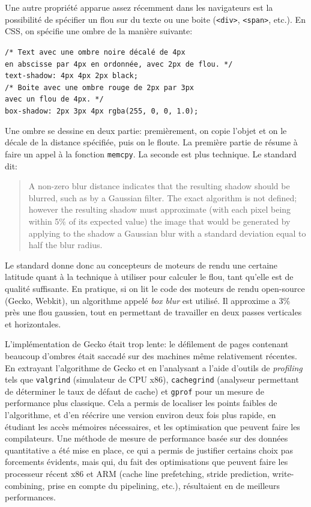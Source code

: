 \documentclass[a4paper,10pt]{article}
\newcommand{\cc}[1]{\texttt{#1}}
\begin{document}
\begin{multicols}{2}
  Une autre propriété apparue assez récemment dans les navigateurs est la
  possibilité de spécifier un flou sur du texte ou une boite (\cc{<div>},
  \cc{<span>}, etc.). En CSS, on spécifie une ombre de la manière suivante:

    \noindent
  {\footnotesize
  \cc{/* Text avec une ombre noire décalé de 4px\\
    en abscisse par 4px en ordonnée, avec 2px de flou. */\\
    text-shadow: 4px 4px 2px black;\\
    /* Boite avec une ombre rouge de 2px par 3px\\
    avec un flou de 4px. */\\
    box-shadow: 2px 3px 4px rgba(255, 0, 0, 1.0);
  }}

  Une ombre se dessine en deux partie: premièrement, on copie l'objet et on le
  décale de la distance spécifiée, puis on le floute. La première partie de
  résume à faire un appel à la fonction \cc{memcpy}. La seconde est plus
  technique. Le standard dit:

  \begin{quote}
    A non-zero blur distance indicates that the resulting shadow should be
    blurred, such as by a Gaussian filter. The exact algorithm is not defined;
    however the resulting shadow must approximate (with each pixel being within
    5\% of its expected value) the image that would be generated by applying to
    the shadow a Gaussian blur with a standard deviation equal to half the blur
    radius.
  \end{quote}

  Le standard donne donc au concepteurs de moteurs de rendu une certaine
  latitude quant à la technique à utiliser pour calculer le flou, tant qu'elle
  est de qualité suffisante. En pratique, si on lit le code des moteurs de rendu
  open-source (Gecko, Webkit), un algorithme appelé \emph{box blur} est utilisé.
  Il approxime a 3\% près une flou gaussien, tout en permettant de travailler en
  deux passes verticales et horizontales.

  L'implémentation de Gecko était trop lente: le défilement de pages contenant
  beaucoup d'ombres était saccadé sur des machines même relativement récentes.
  En extrayant l'algorithme de Gecko et en l'analysant a l'aide d'outils de
  \emph{profiling} tels que \cc{valgrind} (simulateur de CPU x86),
  \cc{cachegrind} (analyseur permettant de déterminer le taux de défaut de
  cache) et \cc{gprof} pour un mesure de performance plus classique. Cela a
  permis de localiser les points faibles de l'algorithme, et d'en réécrire une
  version environ deux fois plus rapide, en étudiant les accès mémoires
  nécessaires, et les optimisation que peuvent faire les compilateurs. Une
  méthode de mesure de performance basée sur des données quantitative a été mise
  en place, ce qui a permis de justifier certains choix pas forcements évidents,
  mais qui, du fait des optimisations que peuvent faire les processeur récent
  x86 et ARM (cache line prefetching, stride prediction, write-combining, prise
  en compte du pipelining, etc.), résultaient en de meilleurs performances.


\end{multicols}
\end{document}
